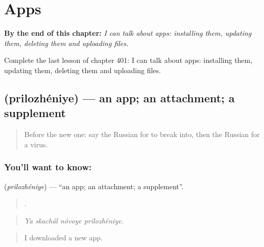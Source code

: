 
\chapter{Apps}
\label{ch:ru-apps}

\begin{chapteropening}
\textbf{By the end of this chapter:} \emph{I can talk about apps: installing them, updating them, deleting them and uploading files.}

Complete the last lesson of chapter 401: I can talk about apps: installing them, updating them, deleting them and uploading files.
\end{chapteropening}

\section[\texorpdfstring{\ru{приложение} (prilozhéniye)}{приложение (prilozhéniye)}]{ (prilozhéniye) — an app; an attachment; a supplement}

\label{lesson:RU-C401-prilozhenie}



\begin{quote}
Before the new one: say the Russian for to break into, then the Russian for a virus.
\end{quote}

\subsection*{You'll want to know: }
\textbf{} (\emph{prilozhéniye}) — \textquotedblleft{}an app; an attachment; a supplement\textquotedblright{}.

\begin{quote}
   .
\end{quote}

\begin{quote}
\emph{Ya skachál nóvoye prilozhéniye.}
\end{quote}

\begin{quote}
I downloaded a new app.
\end{quote}

